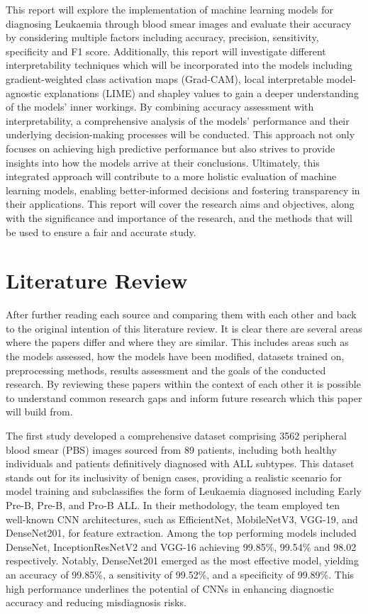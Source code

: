 \documentclass[
	a4paper,
	10pt,
	unnumberedsections,
	twoside,
]{research_article}
\begin{document}
This report will explore the implementation of machine learning models for diagnosing Leukaemia through blood smear images and evaluate their accuracy by considering multiple factors including accuracy, precision, sensitivity, specificity and F1 score. Additionally, this report will investigate different interpretability techniques which will be incorporated into the models including gradient-weighted class activation maps (Grad-CAM), local interpretable model-agnostic explanations (LIME) and shapley values to gain a deeper understanding of the models' inner workings. By combining accuracy assessment with interpretability, a comprehensive analysis of the models' performance and their underlying decision-making processes will be conducted. This approach not only focuses on achieving high predictive performance but also strives to provide insights into how the models arrive at their conclusions. Ultimately, this integrated approach will contribute to a more holistic evaluation of machine learning models, enabling better-informed decisions and fostering transparency in their applications. This report will cover the research aims and objectives, along with the significance and importance of the research, and the methods that will be used to ensure a fair and accurate study.


\section{Literature Review}
After further reading each source and comparing them with each other and back to the original intention of this literature review. It is clear there are several areas where the papers differ and where they are similar. This includes areas such as the models assessed, how the models have been modified, datasets trained on, preprocessing methods, results assessment and the goals of the conducted research. By reviewing these papers within the context of each other it is possible to understand common research gaps and inform future research which this paper will build from.

\pagebreak
The first study developed a comprehensive dataset comprising 3562 peripheral blood smear (PBS) images sourced from 89 patients, including both healthy individuals and patients definitively diagnosed with ALL subtypes. This dataset stands out for its inclusivity of benign cases, providing a realistic scenario for model training and subclassifies the form of Leukaemia diagnosed including Early Pre-B, Pre-B, and Pro-B ALL. In their methodology, the team employed ten well-known CNN architectures, such as EfficientNet, MobileNetV3, VGG-19, and DenseNet201, for feature extraction. Among the top performing models included DenseNet, InceptionResNetV2 and VGG-16 achieving 99.85\%, 99.54\% and 98.02 respectively. Notably, DenseNet201 emerged as the most effective model, yielding an accuracy of 99.85\%, a sensitivity of 99.52\%, and a specificity of 99.89\%. This high performance underlines the potential of CNNs in enhancing diagnostic accuracy and reducing misdiagnosis risks.
\end{document}

